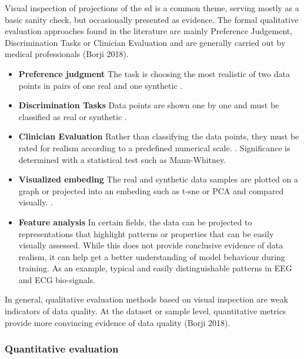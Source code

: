             Visual inspection of projections of the \gls{sd} is a common theme, serving mostly as a basic sanity check, but occasionally presented as evidence. The formal qualitative evaluation approaches found in the literature are mainly Preference Judgement, Discrimination Tasks or Clinician Evaluation and are generally carried out by medical professionals (Borji 2018).
                \begin{itemize}
                    \item \textbf{Preference judgment} The task is choosing the most realistic of two data points in pairs of one real and one synthetic \cite{Choi2017-nt}.
                    \item \textbf{Discrimination Tasks} Data points are shown one by one and must be classified as real or synthetic \cite{Beaulieu-Jones2019-ct}.
                    \item \textbf{Clinician Evaluation} Rather than classifying the data points, they must be rated for realism according to a predefined numerical scale. \cite{Beaulieu-Jones2019-ct}. Significance is determined with a statistical test such as Mann-Whitney.
                    \item \textbf{Visualized embeding} The real and synthetic data samples are plotted on a graph or projected into an embeding such as \gls{t-sne} or PCA and compared visually. \cite{cui2019conan, yu2019rare, zhu_2020, yale2019ESANN, Yang_2019_ehr,Beaulieu-Jones2019-ct, tanti2019, dash2019synthetic}.
                    \item \textbf{Feature analysis} In certain fields, the data can be projected to representations that highlight patterns or properties that can be easily visually assessed. While this does not provide conclusive evidence of data realism, it can help get a better understanding of model behaviour during training. As an example, typical and easily distinguishable patterns in EEG and ECG bio-signals. \cite{Harada2019}
                \end{itemize}
    
        In general, qualitative evaluation methods based on visual inspection are weak indicators of data quality. At the dataset or sample level, quantitative metrics provide more convincing evidence of data quality (Borji 2018).
        
        \subsubsection{Quantitative evaluation}
            
